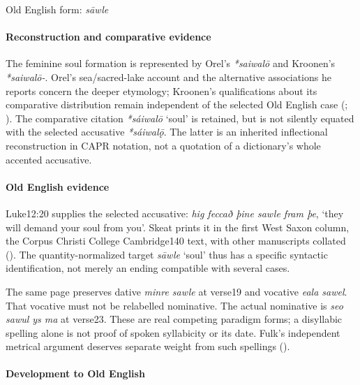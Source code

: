 \documentclass[
  british,
  a4paper,
]{article}
\providecommand{\Recon}[1]{\emph{*#1}}
\begin{document}
Old English form: \emph{sāwle}

\paragraph{Reconstruction and comparative
evidence}\label{reconstruction-and-comparative-evidence-55}

The feminine soul formation is represented by Orel's \emph{*saiwalō} and
Kroonen's \emph{*saiwalō-}. Orel's sea/sacred-lake account and the
alternative associations he reports concern the deeper etymology;
Kroonen's qualifications about its comparative distribution remain
independent of the selected Old English case
(;
). The comparative citation
\Recon{sáiwalō} `soul' is retained, but is not silently equated with the
selected accusative \Recon{sáiwalǭ}. The latter is an inherited
inflectional reconstruction in CAPR notation, not a quotation of a
dictionary's whole accented accusative.

\paragraph{Old English evidence}\label{old-english-evidence-57}

Luke12:20 supplies the selected accusative: \emph{hig feccað þine sawle
fram þe}, `they will demand your soul from you'. Skeat prints it in the
first West Saxon column, the Corpus Christi College Cambridge140 text,
with other manuscripts collated (). The quantity-normalized target {\emph{sāwle}} `soul' thus
has a specific syntactic identification, not merely an ending compatible
with several cases.

The same page preserves dative \emph{minre sawle} at verse19 and
vocative \emph{eala sawel}. That vocative must not be relabelled
nominative. The actual nominative is \emph{seo sawul ys ma} at verse23.
These are real competing paradigm forms; a disyllabic spelling alone is
not proof of spoken syllabicity or its date. Fulk's independent metrical
argument deserves separate weight from such spellings
().

\paragraph{Development to Old
English}\label{development-to-old-english-56}
\end{document}
